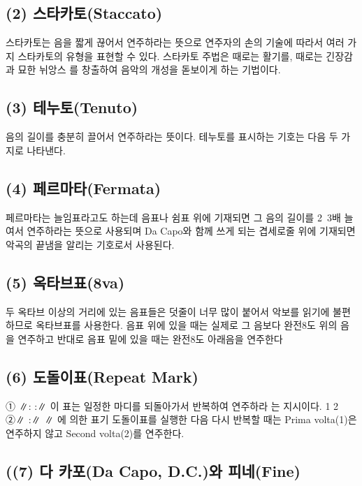 \documentclass[12pt, a4paper, oneside]{book}
\begin{document}
	\subsection{(2) 스타카토(Staccato)}

스타카토는 음을 짧게 끊어서 연주하라는 뜻으로 연주자의 손의
기술에 따라서 여러 가지 스타카토의 유형을 표현할 수 있다.
스타카토 주법은 때로는 활기를, 때로는 긴장감과 묘한 뉘앙스
를 창출하여 음악의 개성을 돋보이게 하는 기법이다.



	\subsection{(3) 테누토(Tenuto)}

음의 길이를 충분히 끌어서 연주하라는 뜻이다.
테누토를 표시하는 기호는 다음 두 가지로 나타낸다.

	\subsection{(4) 페르마타(Fermata)}

페르마타는 늘임표라고도 하는데 음표나 쉼표 위에 기재되면
그 음의 길이를 2~3배 늘여서 연주하라는 뜻으로 사용되며
Da Capo와 함께 쓰게 되는 겹세로줄 위에 기재되면 악곡의
끝냄을 알리는 기호로서 사용된다.

	\subsection{(5) 옥타브표(8va)}

두 옥타브 이상의 거리에 있는 음표들은 덧줄이 너무 많이
붙어서 악보를 읽기에 불편하므로 옥타브표를 사용한다.
음표 위에 있을 때는 실제로 그 음보다 완전8도 위의 음을
연주하고 반대로 음표 밑에 있을 때는 완전8도 아래음을 연주한다


	\subsection{(6) 도돌이표(Repeat Mark)}
① ∥: :∥ 이 표는 일정한 마디를 되돌아가서 반복하여 연주하라
는 지시이다.
1 2
②∥ :∥ ∥ 에 의한 표기
도돌이표를 실행한 다음 다시 반복할 때는 Prima volta(1)은
연주하지 않고 Second volta(2)를 연주한다.

	\subsection{((7) 다 카포(Da Capo, D.C.)와 피네(Fine)}
\end{document}

